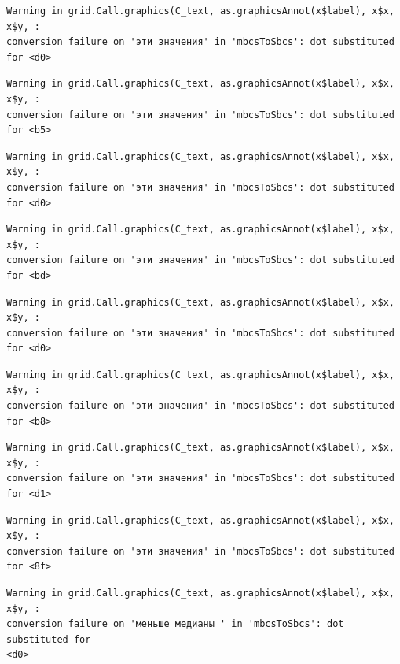 \documentclass[
  letterpaper,
]{scrbook}
\theoremstyle{definition}
\theoremstyle{remark}
\begin{document}
\begin{verbatim}
Warning in grid.Call.graphics(C_text, as.graphicsAnnot(x$label), x$x, x$y, :
conversion failure on 'эти значения' in 'mbcsToSbcs': dot substituted for <d0>
\end{verbatim}

\begin{verbatim}
Warning in grid.Call.graphics(C_text, as.graphicsAnnot(x$label), x$x, x$y, :
conversion failure on 'эти значения' in 'mbcsToSbcs': dot substituted for <b5>
\end{verbatim}

\begin{verbatim}
Warning in grid.Call.graphics(C_text, as.graphicsAnnot(x$label), x$x, x$y, :
conversion failure on 'эти значения' in 'mbcsToSbcs': dot substituted for <d0>
\end{verbatim}

\begin{verbatim}
Warning in grid.Call.graphics(C_text, as.graphicsAnnot(x$label), x$x, x$y, :
conversion failure on 'эти значения' in 'mbcsToSbcs': dot substituted for <bd>
\end{verbatim}

\begin{verbatim}
Warning in grid.Call.graphics(C_text, as.graphicsAnnot(x$label), x$x, x$y, :
conversion failure on 'эти значения' in 'mbcsToSbcs': dot substituted for <d0>
\end{verbatim}

\begin{verbatim}
Warning in grid.Call.graphics(C_text, as.graphicsAnnot(x$label), x$x, x$y, :
conversion failure on 'эти значения' in 'mbcsToSbcs': dot substituted for <b8>
\end{verbatim}

\begin{verbatim}
Warning in grid.Call.graphics(C_text, as.graphicsAnnot(x$label), x$x, x$y, :
conversion failure on 'эти значения' in 'mbcsToSbcs': dot substituted for <d1>
\end{verbatim}

\begin{verbatim}
Warning in grid.Call.graphics(C_text, as.graphicsAnnot(x$label), x$x, x$y, :
conversion failure on 'эти значения' in 'mbcsToSbcs': dot substituted for <8f>
\end{verbatim}

\begin{verbatim}
Warning in grid.Call.graphics(C_text, as.graphicsAnnot(x$label), x$x, x$y, :
conversion failure on 'меньше медианы ' in 'mbcsToSbcs': dot substituted for
<d0>
\end{verbatim}
\end{document}
